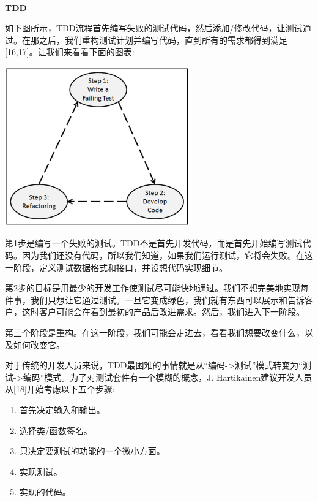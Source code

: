 \noindent\textbf{}\ \par
\textbf{TDD} \ \par
如下图所示，TDD流程首先编写失败的测试代码，然后添加/修改代码，让测试通过。在那之后，我们重构测试计划并编写代码，直到所有的需求都得到满足[16,17]。让我们来看看下面的图表: \par

\begin{center}
	\includegraphics[width=0.6\textwidth]{content/Section-2/Chapter-13/2}
\end{center}

第1步是编写一个失败的测试。TDD不是首先开发代码，而是首先开始编写测试代码。因为我们还没有代码，所以我们知道，如果我们运行测试，它将会失败。在这一阶段，定义测试数据格式和接口，并设想代码实现细节。 \par
第2步的目标是用最少的开发工作使测试尽可能快地通过。我们不想完美地实现每件事，我们只想让它通过测试。一旦它变成绿色，我们就有东西可以展示和告诉客户，这时客户可能会在看到最初的产品后改进需求。然后，我们进入下一阶段。 \par
第三个阶段是重构。在这一阶段，我们可能会走进去，看看我们想要改变什么，以及如何改变它。\par
对于传统的开发人员来说，TDD最困难的事情就是从“编码->测试”模式转变为“测试->编码”模式。为了对测试套件有一个模糊的概念，J. Hartikainen建议开发人员从[18]开始考虑以下五个步骤: \par

\begin{enumerate}
	\item 首先决定输入和输出。
	\item 选择类/函数签名。 
	\item 只决定要测试的功能的一个微小方面。
	\item 实现测试。
	\item 实现的代码。
\end{enumerate}

